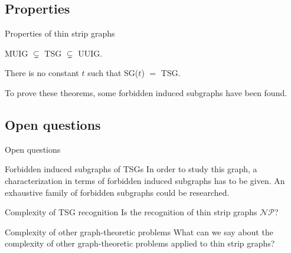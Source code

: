 \subsection{Properties}

  \begin{frame}{Properties of thin strip graphs}
    \begin{theorem}
      MUIG $\subsetneq$ TSG $\subsetneq$ UUIG.
    \end{theorem}
    \begin{theorem}
      There is no constant $t$ such that SG($t$) $=$ TSG.
    \end{theorem}
    \pause
    \begin{remark}
      To prove these theorems, some forbidden induced subgraphs have been found.
    \end{remark}
  \end{frame}


\subsection{Open questions}

\begin{frame}{Open questions}
  \begin{block}{Forbidden induced subgraphs of TSGs}
    In order to study this graph, a characterization in terms of
    forbidden induced subgraphs has to be given. An exhaustive family of forbidden
    subgraphs could be researched.
  \end{block}
  \pause
  \begin{block}{Complexity of TSG recognition}
    Is the recognition of thin strip graphs $\mathcal{NP}$?
  \end{block}
  \pause
  \begin{block}{Complexity of other graph-theoretic problems}
    What can we say about the complexity of other graph-theoretic problems applied to
    thin strip graphs?
  \end{block}
\end{frame}
